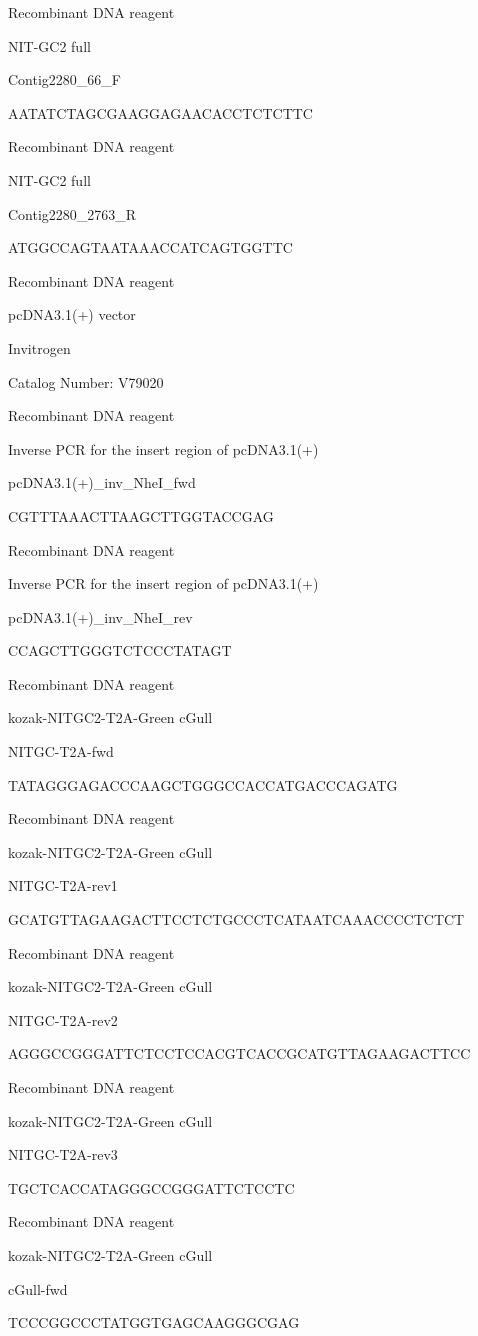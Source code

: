 \documentclass[
  10pt,
  onecolumn]{article}
\begin{document}
Recombinant DNA reagent

NIT-GC2 full

Contig2280\_66\_F

AATATCTAGCGAAGGAGAACACCTCTCTTC

Recombinant DNA reagent

NIT-GC2 full

Contig2280\_2763\_R

ATGGCCAGTAATAAACCATCAGTGGTTC

Recombinant DNA reagent

pcDNA3.1(+) vector

Invitrogen

Catalog Number: V79020

Recombinant DNA reagent

Inverse PCR for the insert region of pcDNA3.1(+)

pcDNA3.1(+)\_inv\_NheI\_fwd

CGTTTAAACTTAAGCTTGGTACCGAG

Recombinant DNA reagent

Inverse PCR for the insert region of pcDNA3.1(+)

pcDNA3.1(+)\_inv\_NheI\_rev

CCAGCTTGGGTCTCCCTATAGT

Recombinant DNA reagent

kozak-NITGC2-T2A-Green cGull

NITGC-T2A-fwd

TATAGGGAGACCCAAGCTGGGCCACCATGACCCAGATG

Recombinant DNA reagent

kozak-NITGC2-T2A-Green cGull

NITGC-T2A-rev1

GCATGTTAGAAGACTTCCTCTGCCCTCATAATCAAACCCCTCTCT

Recombinant DNA reagent

kozak-NITGC2-T2A-Green cGull

NITGC-T2A-rev2

AGGGCCGGGATTCTCCTCCACGTCACCGCATGTTAGAAGACTTCC

Recombinant DNA reagent

kozak-NITGC2-T2A-Green cGull

NITGC-T2A-rev3

TGCTCACCATAGGGCCGGGATTCTCCTC

Recombinant DNA reagent

kozak-NITGC2-T2A-Green cGull

cGull-fwd

TCCCGGCCCTATGGTGAGCAAGGGCGAG
\end{document}
